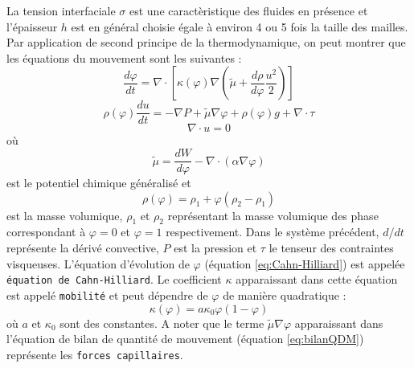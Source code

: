 La tension interfaciale $\sigma$ est une caract\`eristique des fluides en
pr\'esence et l'\'epaisseur $h$ est en g\'en\'eral choisie \'egale \`a environ 4 ou
5 fois la taille des mailles.\medskip\newline
Par application de second principe de la thermodynamique, on peut montrer que les
\'equations du mouvement sont les suivantes :
\begin{equation}
\frac{d\varphi}{dt}=\nabla\cdot\left[\kappa\left(\varphi\right)\nabla\left(\tilde{\mu}+\frac{d\rho}{d\varphi}
\frac{u^2}{2}\right)\right]\label{eq:Cahn-Hilliard}
\end{equation}
\begin{equation}
\rho\left(\varphi\right)\frac{du}{dt}=-\nabla P + \tilde{\mu}\nabla\varphi+\rho\left(\varphi\right)g+\nabla\cdot\tau\label{eq:bilanQDM}
\end{equation}
\begin{equation}
\nabla\cdot u=0\label{eq:GradU}
\end{equation}
o\`u
\begin{equation}
\tilde{\mu}=\frac{dW}{d\varphi}-\nabla\cdot\left(\alpha\nabla\varphi\right)
\end{equation}
est le potentiel chimique g\'en\'eralis\'e et 
\begin{equation}
\rho\left(\varphi\right)=\rho_{1}+\varphi\left(\rho_{2}-\rho_{1}\right)
\end{equation}
est la masse volumique, $\rho_{1}$ et $\rho_{2}$ repr\'esentant la masse volumique des phase correspondant \`a $\varphi=0$ et $\varphi=1$
respectivement.\newline
Dans le syst\`eme pr\'ec\'edent, $d/dt$ repr\'esente la d\'eriv\'e convective, $P$ est la pression et $\tau$ le tenseur des contraintes
visqueuses.\newline
L'\'equation d'\'evolution de $\varphi$ (\'equation \ref{eq:Cahn-Hilliard}) est appel\'ee \texttt{\'equation de Cahn-Hilliard}. Le coefficient
$\kappa$ apparaissant dans cette \'equation est appel\'e \texttt{mobilit\'e} et peut d\'ependre de $\varphi$ de mani\`ere quadratique :
\begin{equation}
\kappa\left(\varphi\right)=a\kappa_{0}\varphi\left(1-\varphi\right)\label{eq:kappa}
\end{equation}
o\`u $a$ et $\kappa_{0}$ sont des constantes.\newline
A noter que le terme $\tilde{\mu}\nabla\varphi$ apparaissant dans l'\'equation de bilan de quantit\'e de mouvement (\'equation \ref{eq:bilanQDM})
repr\'esente les \texttt{forces capillaires}.

